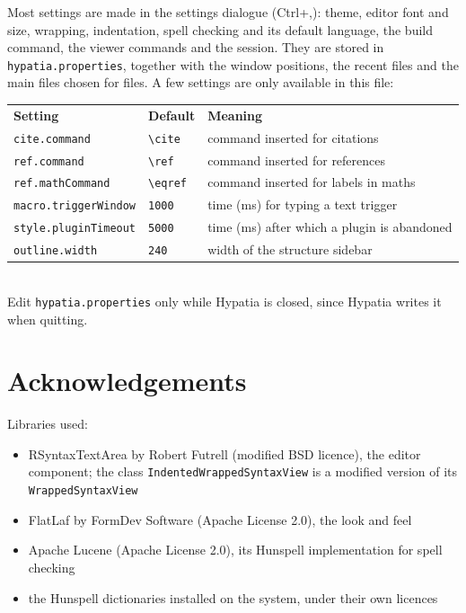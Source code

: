 \documentclass[11pt]{article}
\newcommand{\key}[1]{\textsf{#1}}
\newcommand{\file}[1]{\texttt{#1}}
\begin{document}
    Most settings are made in the settings dialogue (\key{Ctrl+,}): theme, editor font and size, wrapping, indentation, spell checking and its default language, the build command, the viewer commands and the session. They are stored in \file{hypatia.properties}, together with the window positions, the recent files and the main files chosen for files. A few settings are only available in this file:\\[2mm]
    \hspace*{1cm}\begin{tabular}{lll}
        \textbf{Setting} & \textbf{Default} & \textbf{Meaning}\\[1mm]
        \verb+cite.command+ & \verb+\cite+ & command inserted for citations\\
        \verb+ref.command+ & \verb+\ref+ & command inserted for references\\
        \verb+ref.mathCommand+ & \verb+\eqref+ & command inserted for labels in maths\\
        \verb+macro.triggerWindow+ & \verb+1000+ & time (ms) for typing a text trigger\\
        \verb+style.pluginTimeout+ & \verb+5000+ & time (ms) after which a plugin is abandoned\\
        \verb+outline.width+ & \verb+240+ & width of the structure sidebar
    \end{tabular}\\[2mm]
    Edit \file{hypatia.properties} only while Hypatia is closed, since Hypatia writes it when quitting.


    \section{Acknowledgements}

    Libraries used:
    \begin{itemize}
        \itemsep-1mm
        \item RSyntaxTextArea by Robert Futrell (modified BSD licence), the editor component; the class \verb+IndentedWrappedSyntaxView+ is a modified version of its \verb+WrappedSyntaxView+
        \item FlatLaf by FormDev Software (Apache License 2.0), the look and feel
        \item Apache Lucene (Apache License 2.0), its Hunspell implementation for spell checking
        \item the Hunspell dictionaries installed on the system, under their own licences
    \end{itemize}
\end{document}
